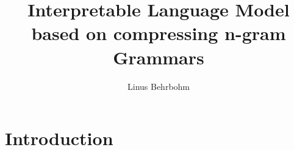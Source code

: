 \documentclass[11pt]{report}
\title{Interpretable Language Model based on compressing n-gram Grammars}
\author{Linus Behrbohm}
\begin{document}
\maketitle

\renewcommand*\contentsname{Outline}
\tableofcontents

\newpage

\chapter{Introduction}





\end{document}
